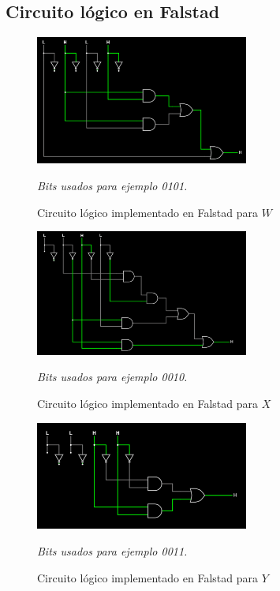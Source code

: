 \saltoPag

\subsection{Circuito lógico en Falstad}

\begin{figure}[h!]
    \centering
    \includegraphics[width=7cm]{imagenes/2.1_W.png}
    \caption{Circuito lógico implementado en Falstad para $W$}
    \label{fig:falstad}
    \footnotesize\textit{Bits usados para ejemplo 0101.}
\end{figure}

\begin{figure}[h!]
    \centering
    \includegraphics[width=7cm]{imagenes/2.1_X.png}
    \caption{Circuito lógico implementado en Falstad para $X$}
    \label{fig:falstad}
    \footnotesize\textit{Bits usados para ejemplo 0010.}
\end{figure}

\begin{figure}[h!]
    \centering
    \includegraphics[width=7cm]{imagenes/2.1_Y.png}
    \caption{Circuito lógico implementado en Falstad para $Y$}
    \label{fig:falstad}
    \footnotesize\textit{Bits usados para ejemplo 0011.}
\end{figure}

